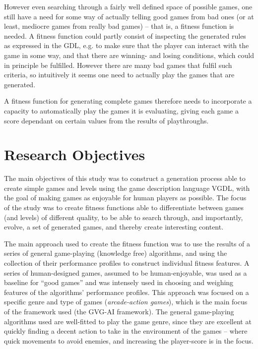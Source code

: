 \documentclass[a4paper,titlepage,final]{report}
\begin{document}
However even searching through a fairly well defined space of possible games, one still have a need for some way of actually telling good games from bad ones (or at least, mediocre games from really bad games) -- that is, a fitness function is needed. 
A fitness function could partly consist of inspecting the generated rules as expressed in the GDL, e.g. to make sure that the player can interact with the game in some way, and that there are winning- and losing conditions, which could in principle be fulfilled. 
However there are many bad games that fulfil such criteria, so intuitively it seems one need to actually play the games that are generated. 

A fitness function for generating complete games therefore needs to incorporate a capacity to automatically play the games it is evaluating, giving each game a score dependant on certain values from the results of playthroughs.


\section{Research Objectives}
\label{sec_researchobj}
The main objectives of this study was to construct a generation process able to create simple games and levels using the game description language VGDL, with the goal of making games as enjoyable for human players as possible.
The focus of the study was to create fitness functions able to differentiate between games (and levels) of different quality, to be able to search through, and importantly, evolve, a set of generated games, and thereby create interesting content.

The main approach used to create the fitness function was to use the results of a series of general game-playing (knowledge free) algorithms, and using the collection of their performance profiles to construct individual fitness features.
A series of human-designed games, assumed to be human-enjoyable, was used as a baseline for ``good games'' and was intensely used in choosing and weighing features of the algorithms' performance profiles.
This approach was focused on a specific genre and type of games (\textit{arcade-action games}), which is the main focus of the framework used (the GVG-AI framework). 
The general game-playing algorithms used are well-fitted to play the game genre, since they are excellent at quickly finding a decent action to take in the environment of the games -- where quick movements to avoid enemies, and increasing the player-score is in the focus.
\end{document}
